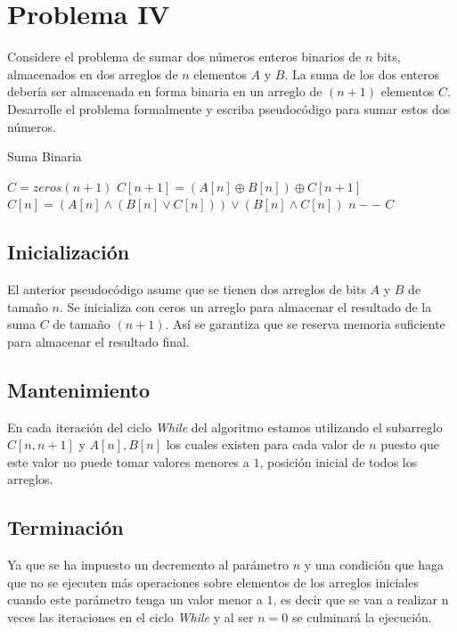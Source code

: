 \section{Problema IV}
Considere el problema de sumar dos números enteros binarios de $n$ bits, almacenados en dos arreglos de $n$ elementos $A$ y $B$. La suma de los dos enteros debería ser almacenada en forma binaria en un arreglo de $(n+1)$ elementos $C$. Desarrolle el problema formalmente y escriba pseudocódigo para sumar estos dos números. 

\begin{algorithm}[H]
    \caption{Suma Binaria}\label{alg:linear_search}
    \begin{algorithmic}[1]
            \State $C = zeros(n+1)$
                \State $C[n+1] = (A[n] \mathbin{\oplus} B[n]) \mathbin{\oplus} C[n+1]$
                \State $C[n] = (A[n] \land (B[n] \lor C[n])) \lor (B[n] \land C[n])$
                \State $n--$
            \EndWhile
            \Return $C$
        \EndProcedure
    \end{algorithmic}
\end{algorithm}

\subsection{Inicialización}
El anterior pseudocódigo asume que se tienen dos arreglos de bits $A$ y $B$ de tamaño $n$. Se inicializa con ceros un arreglo para almacenar el resultado de la suma $C$ de tamaño $(n+1)$. Así se garantiza que se reserva memoria suficiente para almacenar el resultado final.

\subsection{Mantenimiento}
En cada iteración del ciclo \textit{While} del algoritmo estamos utilizando el subarreglo $C[n, n+1]$ y $A[n], B[n]$ los cuales existen para cada valor de $n$ puesto que este valor no puede tomar valores menores a $1$, posición inicial de todos los arreglos.
 
\subsection{Terminación}
Ya que se ha impuesto un decremento al parámetro $n$ y una condición que haga que no se ejecuten más operaciones sobre elementos de los arreglos iniciales cuando este parámetro tenga un valor menor a $1$, es decir que se van a realizar n veces las iteraciones en el ciclo \textit{While} y al ser $n = 0$ se culminará la ejecución.